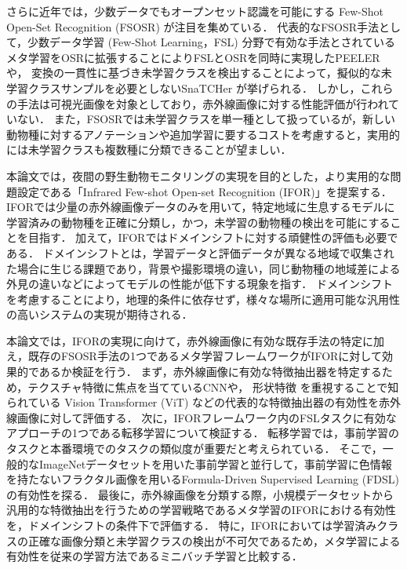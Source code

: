 さらに近年では，少数データでもオープンセット認識を可能にする Few-Shot Open-Set Recognition (FSOSR) \cite{peeler} が注目を集めている．
代表的なFSOSR手法として，少数データ学習 (Few-Shot Learning，FSL) 分野で有効な手法とされているメタ学習をOSRに拡張することによりFSLとOSRを同時に実現したPEELER \cite{peeler}や，
変換の一貫性に基づき未学習クラスを検出することによって，擬似的な未学習クラスサンプルを必要としないSnaTCHer \cite{snatcher}が挙げられる．
しかし，これらの手法は可視光画像を対象としており，赤外線画像に対する性能評価が行われていない．
また，FSOSRでは未学習クラスを単一種として扱っているが，新しい動物種に対するアノテーションや追加学習に要するコストを考慮すると，実用的には未学習クラスも複数種に分類できることが望ましい．

本論文では，夜間の野生動物モニタリングの実現を目的とした，より実用的な問題設定である「Infrared Few-shot Open-set Recognition (IFOR)」を提案する．
IFORでは少量の赤外線画像データのみを用いて，特定地域に生息するモデルに学習済みの動物種を正確に分類し，かつ，未学習の動物種の検出を可能にすることを目指す．
加えて，IFORではドメインシフトに対する頑健性の評価も必要である．
ドメインシフトとは，学習データと評価データが異なる地域で収集された場合に生じる課題であり，背景や撮影環境の違い，同じ動物種の地域差による外見の違いなどによってモデルの性能が低下する現象を指す．
ドメインシフトを考慮することにより，地理的条件に依存せず，様々な場所に適用可能な汎用性の高いシステムの実現が期待される．

本論文では，IFORの実現に向けて，赤外線画像に有効な既存手法の特定に加え，既存のFSOSR手法の1つであるメタ学習フレームワークがIFORに対して効果的であるか検証を行う．
まず，赤外線画像に有効な特徴抽出器を特定するため，テクスチャ特徴に焦点を当てているCNNや，
形状特徴 \cite{feature}を重視することで知られている Vision Transformer (ViT) \cite{vit}などの代表的な特徴抽出器の有効性を赤外線画像に対して評価する．
次に，IFORフレームワーク内のFSLタスクに有効なアプローチの1つである転移学習について検証する．
転移学習では，事前学習のタスクと本番環境でのタスクの類似度が重要だと考えられている．
そこで，一般的なImageNetデータセットを用いた事前学習と並行して，事前学習に色情報を持たないフラクタル画像を用いるFormula-Driven Supervised Learning (FDSL) \cite{fdsl}の有効性を探る．
最後に，赤外線画像を分類する際，小規模データセットから汎用的な特徴抽出を行うための学習戦略であるメタ学習のIFORにおける有効性を，ドメインシフトの条件下で評価する．
特に，IFORにおいては学習済みクラスの正確な画像分類と未学習クラスの検出が不可欠であるため，メタ学習による有効性を従来の学習方法であるミニバッチ学習と比較する．

